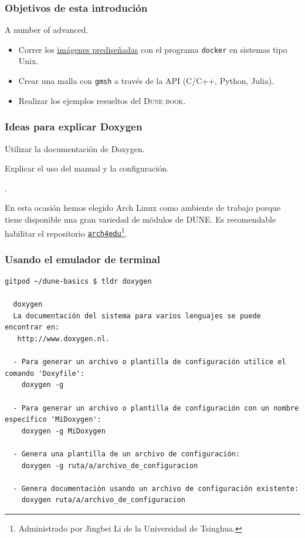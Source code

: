 




\begin{frame}
	\frametitle{Objetivos de esta introdución}
	A number of advanced.
	\begin{itemize}
		\item Correr los \href{https://github.com/orgs/cpp-review-dune/packages}{imágenes prediseñadas} con el programa \lstinline{docker} en sistemas tipo Unix.
		\item Crear una malla con \lstinline{gmsh} a través de la API (C/C++, Python, Julia).
		\item Realizar los ejemplos resueltos del \textsc{Dune book}.
	\end{itemize}
\end{frame}

\begin{frame}
	\frametitle{Ideas para explicar Doxygen}
	\begin{description}
	\item Utilizar la documentación de Doxygen.
	\item Explicar el uso del manual y la configuración.
	\item .
	\end{description}
\end{frame}

\begin{frame}

	En esta ocasión hemos elegido Arch Linux como ambiente de trabajo porque tiene disponible una gran variedad de módulos de DUNE.
	Es recomendable habilitar el repositorio \href{https://wiki.archlinux.org/title/Unofficial\_user\_repositories\#arch4edu}{\texttt{arch4edu}}\footnote{Administrado por Jingbei Li de la Universidad de Tsinghua.}.
\end{frame}

\begin{frame}
	\frametitle{Usando el emulador de terminal}
\end{frame}

\begin{frame}[fragile]\LARGE
\begin{lstlisting}
gitpod ~/dune-basics $ tldr doxygen

  doxygen
  La documentación del sistema para varios lenguajes se puede encontrar en: 
   http://www.doxygen.nl.

  - Para generar un archivo o plantilla de configuración utilice el comando 'Doxyfile':
    doxygen -g

  - Para generar un archivo o plantilla de configuración con un nombre específico 'MiDoxygen':
    doxygen -g MiDoxygen

  - Genera una plantilla de un archivo de configuración:
    doxygen -g ruta/a/archivo_de_configuracion

  - Genera documentación usando un archivo de configuración existente:
    doxygen ruta/a/archivo_de_configuracion

\end{lstlisting}
\end{frame}

